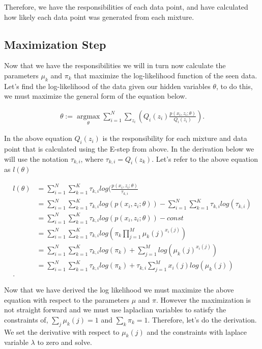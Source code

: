 \documentclass[paper=a4, fontsize=11pt]{scrartcl} %
\begin{document}
Therefore, we have the responsibilities of each data point, and have calculated how likely each data point was generated from each mixture.

\subsection{Maximization Step}
Now that we have the responsibilities we will in turn now calculate the parameters $\mu_k$ and $\pi_k$ that maximize the log-likelihood function of the seen data.
Let's find the log-likelihood of the data given our hidden variables $\theta$, to do this, we must maximize the general form of the equation below.

\begin{align}
\theta := \underset{\theta}{\operatorname{argmax}}\sum_{i=1}^N \sum_{z_i}(Q_i(z_i)\frac{p(x_i,z_i;\theta)}{Q_i(z_i)}).
\end{align}

In the above equation $Q_i(z_i)$ is the responsibility for each mixture and data point that is calculated using the E-step from above.
In the derivation below we will use the notation $\tau_{k,i}$, where $\tau_{k,i} = Q_i(z_k)$.
Let's refer to the above equation as $l(\theta)$

\begin{align}
l(\theta) &= \sum_{i=1}^N \sum_{k=1}^K \tau_{k,i} log(\frac{p(x_i,z_i;\theta)}{\tau_{k,i}} \\
&= \sum_{i=1}^N \sum_{k=1}^K \tau_{k,i} log(p(x_i,z_i;\theta)) -  \sum_{i=1}^N \sum_{k=1}^K \tau_{k,i} log( \tau_{k,i}) \\
&= \sum_{i=1}^N \sum_{k=1}^K \tau_{k,i} log(p(x_i,z_i;\theta)) -  const \\
&=  \sum_{i=1}^N \sum_{k=1}^K \tau_{k,i} log( \pi_k\prod_{j=1}^M \mu_k(j)^{x_i(j)}) \\
&= \sum_{i=1}^N \sum_{k=1}^K \tau_{k,i} log(\pi_k) + \sum_{j=1}^M log(\mu_k(j)^{x_i(j)}) \\
&= \sum_{i=1}^N \sum_{k=1}^K \tau_{k,i} log(\pi_k) + \tau_{k,i}\sum_{j=1}^M x_i(j) log(\mu_k(j)) \\.
\end{align}

Now that we have derived the log likelihood we must maximize the above equation with respect to the parameters $\mu$ and $\pi$.
However the maximization is not straight forward and we must use laplaclian variables to satisfy the constraints of, $\sum_j \mu_k(j) = 1$ and $\sum_k \pi_k = 1$.
Therefore, let's do the derivation.
We set the derivative with respect to $\mu_k(j)$ and the constraints with laplace variable $\lambda$ to zero and solve.
\end{document}
